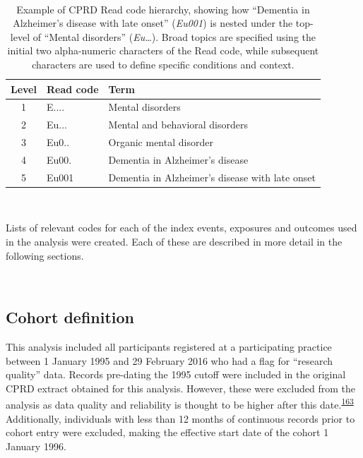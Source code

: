 \documentclass[a4paper, twoside]{templates/ociamthesis}
\begin{document}
~





\begin{table}[H]

\caption[Example of CPRD Read code hierarchy]{\label{tab:readExample-table}Example of CPRD Read code hierarchy, showing how ``Dementia in Alzheimer's disease with late onset'' (\emph{Eu001}) is nested under the top-level of ``Mental disorders'' (\emph{Eu\ldots{}}). Broad topics are specified using the initial two alpha-numeric characters of the Read code, while subsequent characters are used to define specific conditions and context.}
\centering
\begin{tabular}[t]{cll}
\toprule
\textbf{Level} & \textbf{Read code} & \textbf{Term}\\
\midrule
1 & E.... & Mental disorders\\
2 & Eu... & Mental and behavioral disorders\\
3 & Eu0.. & Organic mental disorder\\
4 & Eu00. & Dementia in Alzheimer's disease\\
5 & Eu001 & Dementia in Alzheimer's disease with late onset\\
\bottomrule
\end{tabular}
\end{table}

~

Lists of relevant codes for each of the index events, exposures and outcomes used in the analysis were created. Each of these are described in more detail in the following sections.

~

\hypertarget{cohort-definition}{%
\subsection{Cohort definition}\label{cohort-definition}}

This analysis included all participants registered at a participating practice between 1 January 1995 and 29 February 2016 who had a flag for ``research quality'' data. Records pre-dating the 1995 cutoff were included in the original CPRD extract obtained for this analysis. However, these were excluded from the analysis as data quality and reliability is thought to be higher after this date.\textsuperscript{\protect\hyperlink{ref-wolf2019}{163}} Additionally, individuals with less than 12 months of continuous records prior to cohort entry were excluded, making the effective start date of the cohort 1 January 1996.
\end{document}
